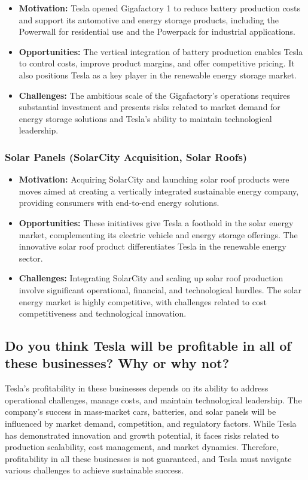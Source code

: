 \documentclass[UTF8,a4paper,AutoFakeBold,AutoFakeSlant]{article}
\begin{document}
\begin{itemize}
\item \textbf{Motivation:} Tesla opened Gigafactory 1 to reduce battery production costs and support its automotive and energy storage products, including the Powerwall for residential use and the Powerpack for industrial applications.
\item \textbf{Opportunities:} The vertical integration of battery production enables Tesla to control costs, improve product margins, and offer competitive pricing. It also positions Tesla as a key player in the renewable energy storage market.
\item \textbf{Challenges:} The ambitious scale of the Gigafactory's operations requires substantial investment and presents risks related to market demand for energy storage solutions and Tesla's ability to maintain technological leadership.
\end{itemize}

\subsubsection{Solar Panels (SolarCity Acquisition, Solar Roofs)}

\begin{itemize}
\item \textbf{Motivation:} Acquiring SolarCity and launching solar roof products were moves aimed at creating a vertically integrated sustainable energy company, providing consumers with end-to-end energy solutions.
\item \textbf{Opportunities:} These initiatives give Tesla a foothold in the solar energy market, complementing its electric vehicle and energy storage offerings. The innovative solar roof product differentiates Tesla in the renewable energy sector.
\item \textbf{Challenges:} Integrating SolarCity and scaling up solar roof production involve significant operational, financial, and technological hurdles. The solar energy market is highly competitive, with challenges related to cost competitiveness and technological innovation.
\end{itemize}


\subsection{Do you think Tesla will be profitable in all of these businesses? Why or why not?}

Tesla's profitability in these businesses depends on its ability to address operational challenges, manage costs, and maintain technological leadership. The company's success in mass-market cars, batteries, and solar panels will be influenced by market demand, competition, and regulatory factors. While Tesla has demonstrated innovation and growth potential, it faces risks related to production scalability, cost management, and market dynamics. Therefore, profitability in all these businesses is not guaranteed, and Tesla must navigate various challenges to achieve sustainable success.
\end{document}
